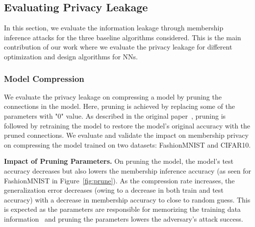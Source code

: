 \subsection{Evaluating Privacy Leakage}
\label{eval-leakage}

In this section, we evaluate the information leakage through membership inference attacks for the three baseline algorithms considered.
This is the main contribution of our work where we evaluate the privacy leakage for different optimization and design algorithms for NNs.

\subsubsection{Model Compression}

We evaluate the privacy leakage on compressing a model by pruning the connections in the model.
Here, pruning is achieved by replacing some of the parameters with "0" value.
As described in the original paper~\cite{Han:2015:LBW:2969239.2969366,DBLP:journals/corr/HanPNMTECTD16}, pruning is followed by retraining the model to restore the model's original accuracy with the pruned connections.
We evaluate and validate the impact on membership privacy on compressing the model trained on two datasets: FashionMNIST and CIFAR10.

\textbf{Impact of Pruning Parameters.} On pruning the model, the model's test accuracy decreases but also lowers the membership inference accuracy (as seen for FashionMNIST in Figure~\ref{fig:prune}).
As the compression rate increases, the generalization error decreases (owing to a decrease in both train and test accuracy) with a decrease in membership accuracy to close to random guess.
This is expected as the parameters are responsible for memorizing the training data information~\cite{DBLP:journals/corr/abs-1812-00910,236216,10.1145/3133956.3134077} and pruning the parameters lowers the adversary's attack success.

